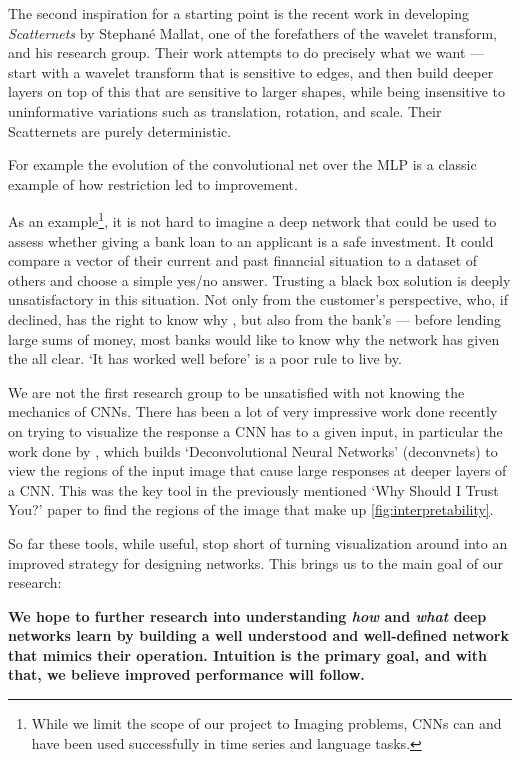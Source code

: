   The second inspiration for a starting point is the recent work in developing
  \emph{Scatternets} by Stephan\'{e} Mallat, one of the forefathers of the wavelet
  transform, and his research group. Their work attempts to do precisely
  what we want --- start with a wavelet transform that is sensitive to edges,
  and then build deeper layers on top of this that are sensitive to larger
  shapes, while being insensitive to uninformative variations such as
  translation, rotation, and scale. Their Scatternets are purely deterministic.

For example the evolution of the convolutional net over the MLP is a classic
example of how restriction led to improvement.


As an example\footnote{While we limit the scope of our project to Imaging
problems, CNNs can and have been used successfully in time series and
language tasks.}, it is not hard to imagine a deep network that could be used to
assess whether giving a bank loan to an applicant is a safe investment. It
could compare a vector of their current and past financial situation to
a dataset of others and choose a simple yes/no answer. Trusting a black box
solution is deeply unsatisfactory in this situation. Not only from the
customer's perspective, who, if declined, has the right to know why
\cite{goodman_european_2016}, but
also from the bank's --- before lending large sums of money, most banks
would like to know why the network has given the all clear. `It has worked well
before' is a poor rule to live by.

  We are not the first research group to be unsatisfied with not knowing the
  mechanics of CNNs. There has been a lot of very impressive work done recently
  on trying to visualize the response a CNN has to a given input, in particular
  the work done by \cite{zeiler_visualizing_compact_2014}, which builds
  `Deconvolutional Neural Networks' (deconvnets) to view the regions of the
  input image that cause large responses at deeper layers of a CNN\@. This was the key
  tool in the previously mentioned `Why Should I Trust You?' paper
  \cite{ribeiro_why_2016} to find the regions of the image that make up
  \autoref{fig:interpretability}.

  So far these tools, while useful, stop short of turning visualization around into an
  improved strategy for designing networks. This brings us to the main goal of
  our research:

  \begin{goals}\bf
    We hope to further research into understanding \emph{how} and \emph{what} deep networks
    learn by building a well understood and well-defined network that mimics
    their operation. Intuition is the primary goal, and with that, we
    believe improved performance will follow.
  \end{goals}

